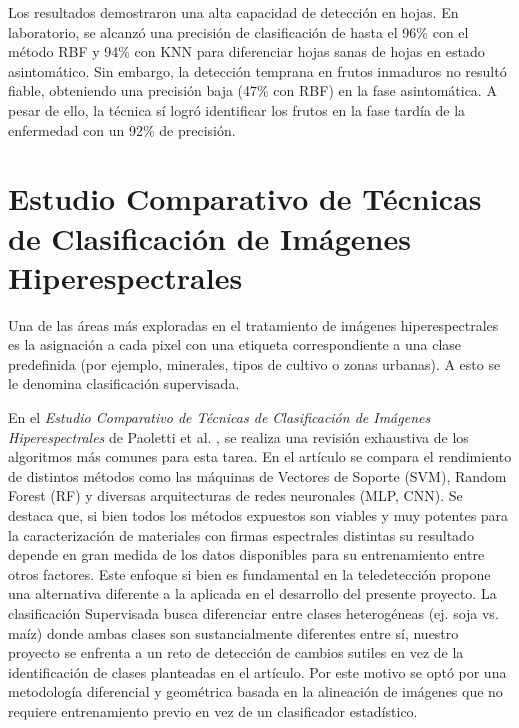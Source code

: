  Los resultados demostraron una alta capacidad de detección en hojas. En laboratorio, se alcanzó una precisión de clasificación de hasta el 96\% con el método RBF y 94\% con KNN para diferenciar hojas sanas de hojas en estado asintomático. Sin embargo, la detección temprana en frutos inmaduros no resultó fiable, obteniendo una precisión baja (47\% con RBF) en la fase asintomática. A pesar de ello, la técnica sí logró identificar los frutos en la fase tardía de la enfermedad con un 92\% de precisión. 


 
\section{Estudio Comparativo de Técnicas de Clasificación de Imágenes Hiperespectrales}
Una de las áreas más exploradas en el tratamiento de imágenes hiperespectrales es la asignación a  cada pixel con una etiqueta correspondiente a una clase predefinida (por ejemplo, minerales, tipos de cultivo o zonas urbanas). A esto se le denomina clasificación supervisada.

 En el \textit{Estudio Comparativo de Técnicas de Clasificación de Imágenes Hiperespectrales} de Paoletti et al. \cite{Paoletti_Haut_Plaza_Plaza_2019}, se realiza una revisión exhaustiva de los algoritmos más comunes para esta tarea. En el artículo se compara el rendimiento de distintos métodos como las máquinas de Vectores de Soporte (SVM), Random Forest (RF) y diversas arquitecturas de redes neuronales (MLP, CNN). Se destaca que, si bien todos los métodos expuestos son viables y muy potentes para la caracterización de materiales con firmas espectrales distintas su resultado depende en gran medida de los datos disponibles para su entrenamiento entre otros factores.
 Este enfoque si bien es fundamental en la teledetección propone una alternativa diferente a la aplicada en el desarrollo del presente proyecto. La clasificación Supervisada busca diferenciar entre clases heterogéneas (ej. soja vs. maíz) donde ambas clases son sustancialmente diferentes entre sí, nuestro proyecto se enfrenta a un reto de detección de cambios sutiles en vez de la identificación de clases planteadas en el artículo. Por este motivo se optó por una metodología diferencial y geométrica basada en la alineación de imágenes que no requiere entrenamiento previo en vez de un clasificador estadístico.
